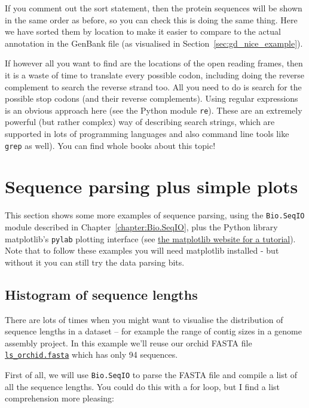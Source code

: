 \documentclass{report}
\begin{document}
If you comment out the sort statement, then the protein sequences will be
shown in the same order as before, so you can check this is doing the same
thing.  Here we have sorted them by location to make it easier to compare
to the actual annotation in the GenBank file (as visualised in
Section~\ref{sec:gd_nice_example}).

If however all you want to find are the locations of the open reading frames,
then it is a waste of time to translate every possible codon, including doing
the reverse complement to search the reverse strand too.  All you need to do
is search for the possible stop codons (and their reverse complements).  Using
regular expressions is an obvious approach here (see the Python module
\verb|re|). These are an extremely powerful (but rather complex) way of
describing search strings, which are supported in lots of programming
languages and also command line tools like \texttt{grep} as well). You can
find whole books about this topic!


\section{Sequence parsing plus simple plots}
\label{seq:sequence-parsing-plus-pylab}

This section shows some more examples of sequence parsing, using the \verb|Bio.SeqIO|
module described in Chapter~\ref{chapter:Bio.SeqIO}, plus the Python library matplotlib's \verb|pylab| plotting interface (see \href{http://matplotlib.sourceforge.net/}{the matplotlib website for a tutorial}).  Note that to follow these examples you will need matplotlib installed - but without it you can still try the data parsing bits.

\subsection{Histogram of sequence lengths}

There are lots of times when you might want to visualise the distribution of sequence
lengths in a dataset -- for example the range of contig sizes in a genome assembly
project.  In this example we'll reuse our orchid FASTA file \href{http://biopython.org/DIST/docs/tutorial/examples/ls_orchid.fasta}{\tt ls\_orchid.fasta} which has only 94 sequences.

First of all, we will use \verb|Bio.SeqIO| to parse the FASTA file and compile a list
of all the sequence lengths.  You could do this with a for loop, but I find a list
comprehension more pleasing:
\end{document}
